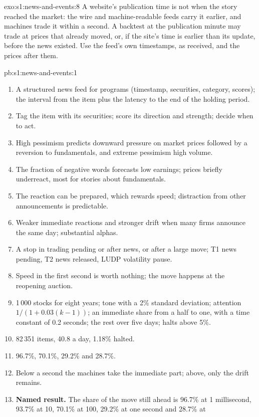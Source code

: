 \begin{solution}{exo:s1:news-and-events:8}
A website's publication time is not when the story reached the market: the wire and machine-readable feeds carry it earlier, and machines trade it within
a second. A backtest at the publication minute may trade at prices that already moved, or, if the site's time is earlier than its update, before the
news existed. Use the feed's own timestamps, as received, and the prices after them.
\end{solution}

\begin{solution}{pb:s1:news-and-events:1}
\begin{enumerate}
\item A structured news feed for programs (timestamp, securities, category, scores); the interval from the item plus the latency to the end of the holding
period.
\item Tag the item with its securities; score its direction and strength; decide when to act.
\item High pessimism predicts downward pressure on market prices followed by a reversion to fundamentals, and extreme pessimism high volume.
\item The fraction of negative words forecasts low earnings; prices briefly underreact, most for stories about fundamentals.
\item The reaction can be prepared, which rewards speed; distraction from other announcements is predictable.
\item Weaker immediate reactions and stronger drift when many firms announce the same day; substantial alphas.
\item A stop in trading pending or after news, or after a large move; T1 news pending, T2 news released, LUDP volatility pause.
\item Speed in the first second is worth nothing; the move happens at the reopening auction.
\item 1\,000 stocks for eight years; tone with a 2\% standard deviation; attention $1/(1+0.03(k-1))$; an immediate share from a half to one, with a time
constant of 0.2 seconds; the rest over five days; halts above 5\%.
\item 82\,351 items, 40.8 a day, 1.18\% halted.
\item 96.7\%, 70.1\%, 29.2\% and 28.7\%.
\item Below a second the machines take the immediate part; above, only the drift remains.
\item \textbf{Named result.} The share of the move still ahead is 96.7\% at 1 millisecond, 93.7\% at 10, 70.1\% at 100, 29.2\% at one second and 28.7\% at

\end{enumerate}
\end{solution}
